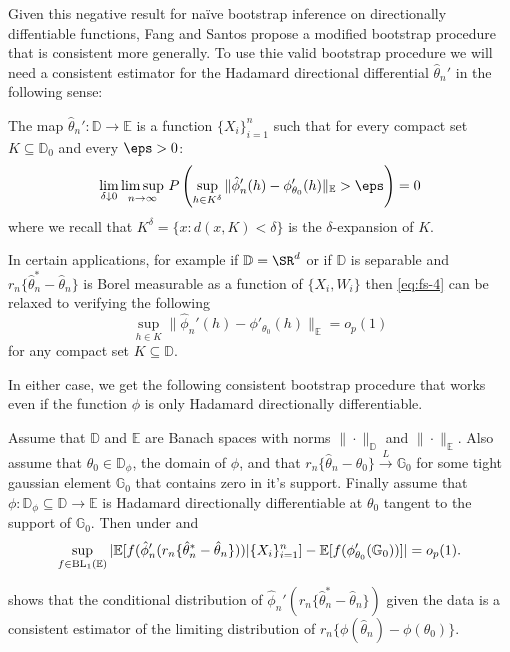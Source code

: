 Given this negative result for naïve bootstrap inference on directionally diffentiable functions, Fang and Santos propose a modified bootstrap procedure that is consistent more generally. To use thie valid bootstrap procedure we will need a consistent estimator for the Hadamard directional differential \(\hat\theta_n'\) in the following sense:
\begin{assumption}
	\label{assm:fs-4}
	The map \(\hat\theta_n':\mathbb{D}\to\mathbb{E}\) is a function \(\{X_i\}_{i=1}^n\) such that for every compact set \(K\subseteq\mathbb{D}_0\) and every \(\eps>0\):
	\begin{equation}
		\label{eq:fs-4}
		\lim_{\delta\downarrow 0}\limsup_{n\to\infty}\, P\left(\sup_{h\in K^\delta} \|\hat\phi_n'(h)-\phi_{\theta_0}'(h)\|_{\mathbb{E}}>\eps\right) =0
	\end{equation}
	where we recall that \(K^\delta = \{x: d(x,K)<\delta\} \) is the \(\delta\)-expansion of \(K\).
\end{assumption}
\begin{remark*}
	In certain applications, for example if \(\mathbb{D}=\SR^d\) or if \(\mathbb{D}\) is separable and \(r_n\{\hat\theta_n^*-\hat\theta_n\}\) is Borel measurable as a function of \(\{X_i,W_i\}\) then \eqref{eq:fs-4} can be relaxed to verifying the following 
	\begin{equation}
		\label{eq:fs-3.3}
		\sup_{h\in K}\|\hat\phi_n'(h)-\phi'_{\theta_0}(h)\|_{\mathbb{E}} = o_p(1)
	\end{equation}
	for any compact set \(K\subseteq \mathbb{D}\).
\end{remark*}
In either case, we get the following consistent bootstrap procedure that works even if the function \(\phi\) is only Hadamard directionally differentiable.
\begin{theorem}
	\label{thm:fs-3.2}
	Assume that \(\mathbb{D}\) and \(\mathbb{E}\) are Banach spaces with norms \(\|\cdot\|_{\mathbb{D}}\) and \(\|\cdot\|_{\mathbb{E}}\). Also assume that \(\theta_0\in \mathbb{D}_{\phi}\), the domain of \(\phi\), and that \(r_n\{\hat\theta_n-\theta_0\}\overset{L}{\to} \mathbb{G}_0\) for some tight gaussian element \(\mathbb{G}_0\) that contains zero in it's support. Finally assume that \(\phi:\mathbb{D}_\phi\subseteq\mathbb{D}\to \mathbb{E}\) is Hadamard directionally differentiable at \(\theta_0\) tangent to the support of \(\mathbb{G}_0\). Then under  and 
	\[
		\sup_{f\in\text{BL}_1(\mathbb{E})}|\mathbb{E}[f(\hat\phi_n'(r_n\{\hat\theta_n^*-\hat\theta_n\}))|\{X_i\}_{i=1}^n]-\mathbb{E}[f(\phi_{\theta_0}'(\mathbb{G}_0))]|=o_p(1)
	.\] 
\end{theorem}
 shows that the conditional distribution of \(\hat\phi_n'(r_n\{\hat\theta^*_n-\hat\theta_n\})\) given the data is a consistent estimator of the limiting distribution of \(r_n\{\phi(\hat\theta_n)-\phi(\theta_0)\}\).
